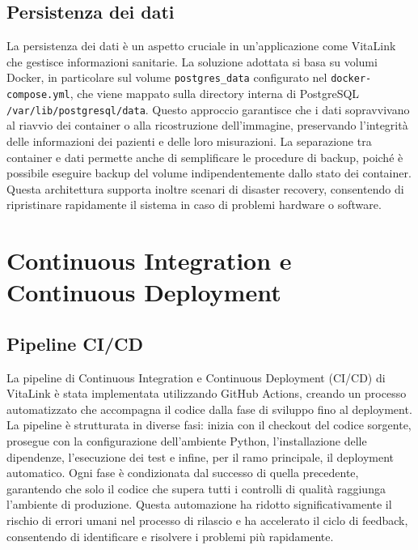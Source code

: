 \documentclass[12pt,a4paper,oneside]{report}
\begin{document}
\subsection{Persistenza dei dati}
La persistenza dei dati è un aspetto cruciale in un'applicazione come VitaLink che gestisce informazioni sanitarie. La soluzione adottata si basa su volumi Docker, in particolare sul volume \texttt{postgres\_data} configurato nel \texttt{docker-compose.yml}, che viene mappato sulla directory interna di PostgreSQL \texttt{/var/lib/postgresql/data}. Questo approccio garantisce che i dati sopravvivano al riavvio dei container o alla ricostruzione dell'immagine, preservando l'integrità delle informazioni dei pazienti e delle loro misurazioni. La separazione tra container e dati permette anche di semplificare le procedure di backup, poiché è possibile eseguire backup del volume indipendentemente dallo stato dei container. Questa architettura supporta inoltre scenari di disaster recovery, consentendo di ripristinare rapidamente il sistema in caso di problemi hardware o software.

\section{Continuous Integration e Continuous Deployment}
\subsection{Pipeline CI/CD}
La pipeline di Continuous Integration e Continuous Deployment (CI/CD) di VitaLink è stata implementata utilizzando GitHub Actions, creando un processo automatizzato che accompagna il codice dalla fase di sviluppo fino al deployment. La pipeline è strutturata in diverse fasi: inizia con il checkout del codice sorgente, prosegue con la configurazione dell'ambiente Python, l'installazione delle dipendenze, l'esecuzione dei test e infine, per il ramo principale, il deployment automatico. Ogni fase è condizionata dal successo di quella precedente, garantendo che solo il codice che supera tutti i controlli di qualità raggiunga l'ambiente di produzione. Questa automazione ha ridotto significativamente il rischio di errori umani nel processo di rilascio e ha accelerato il ciclo di feedback, consentendo di identificare e risolvere i problemi più rapidamente.
\end{document}
